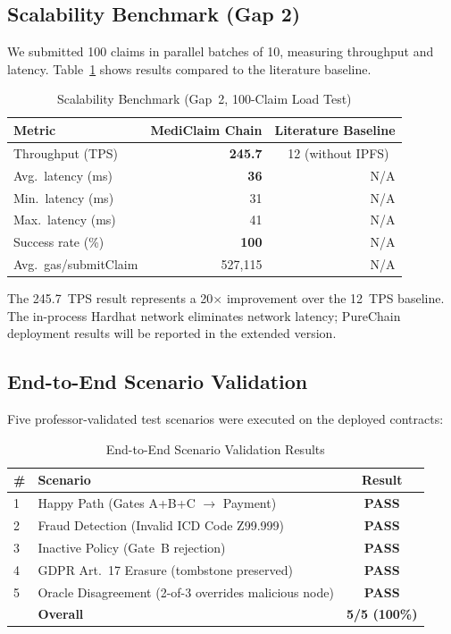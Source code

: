 \documentclass[journal]{IEEEtran}
\begin{document}
\subsection{Scalability Benchmark (Gap 2)}

We submitted 100 claims in parallel batches of 10, measuring throughput and
latency. Table~\ref{tab:scale} shows results compared to the literature
baseline.

\begin{table}[h]
\centering
\caption{Scalability Benchmark (Gap~2, 100-Claim Load Test)}
\label{tab:scale}
\begin{tabular}{@{}lrr@{}}
\toprule
Metric & MediClaim Chain & Literature Baseline \\
\midrule
Throughput (TPS)      & \textbf{245.7}   & 12 (without IPFS)~\cite{lit:pmc11111748} \\
Avg.\ latency (ms)    & \textbf{36}      & N/A \\
Min.\ latency (ms)    & 31               & N/A \\
Max.\ latency (ms)    & 41               & N/A \\
Success rate (\%)     & \textbf{100}     & N/A \\
Avg.\ gas/submitClaim & 527,115          & N/A \\
\bottomrule
\end{tabular}
\end{table}

The 245.7~TPS result represents a 20$\times$ improvement over the 12~TPS
baseline. The in-process Hardhat network eliminates network latency; PureChain
deployment results will be reported in the extended version.

\subsection{End-to-End Scenario Validation}

Five professor-validated test scenarios were executed on the deployed contracts:

\begin{table}[h]
\centering
\caption{End-to-End Scenario Validation Results}
\label{tab:scenarios}
\begin{tabular}{@{}llc@{}}
\toprule
\# & Scenario & Result \\
\midrule
1 & Happy Path (Gates A+B+C $\to$ Payment) & \textbf{PASS} \\
2 & Fraud Detection (Invalid ICD Code Z99.999) & \textbf{PASS} \\
3 & Inactive Policy (Gate~B rejection) & \textbf{PASS} \\
4 & GDPR Art.~17 Erasure (tombstone preserved) & \textbf{PASS} \\
5 & Oracle Disagreement (2-of-3 overrides malicious node) & \textbf{PASS} \\
\midrule
& \textbf{Overall} & \textbf{5/5 (100\%)} \\
\bottomrule
\end{tabular}
\end{table}
\end{document}
